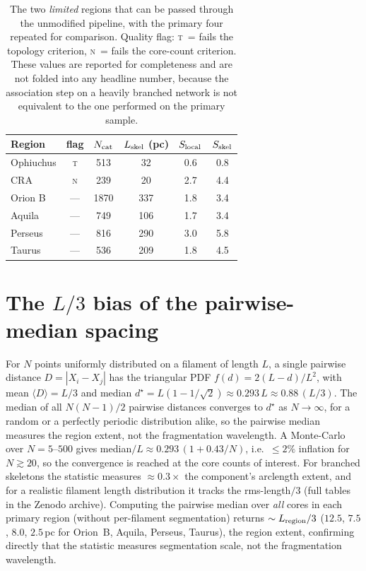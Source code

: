 \documentclass[usenatbib,twoside,twocolumn]{mnras}
\begin{document}
\begin{table}
\caption{The two \emph{limited} regions that can be passed through the unmodified pipeline, with the primary four repeated for comparison. Quality flag: \textsc{t}~= fails the topology criterion, \textsc{n}~= fails the core-count criterion. These values are reported for completeness and are not folded into any headline number, because the association step on a heavily branched network is not equivalent to the one performed on the primary sample.}
\label{tab:limited}
\footnotesize
\setlength{\tabcolsep}{4pt}
\begin{tabular}{lccccc}
\toprule
Region & flag & $N_{\rm cat}$ & $L_{\rm skel}$ (pc) & $S_{\rm local}$ & $S_{\rm skel}$ \\
\midrule
Ophiuchus & \textsc{t} & 513 & 32 & 0.6 & 0.8 \\
CRA       & \textsc{n} & 239 & 20 & 2.7 & 4.4 \\
\midrule
Orion B & --- & 1870 & 337 & 1.8 & 3.4 \\
Aquila  & --- &  749 & 106 & 1.7 & 3.4 \\
Perseus & --- &  816 & 290 & 3.0 & 5.8 \\
Taurus  & --- &  536 & 209 & 1.8 & 4.5 \\
\bottomrule
\end{tabular}
\end{table}




\section{The $L/3$ bias of the pairwise-median spacing}
\label{sec:pwmedian}
For $N$ points uniformly distributed on a filament of length $L$, a single pairwise distance $D=|X_i-X_j|$ has the triangular PDF $f(d)=2(L-d)/L^2$, with mean $\langle D\rangle=L/3$ and median $d^\star=L(1-1/\sqrt{2})\approx0.293\,L\approx0.88\,(L/3)$. The median of all $N(N-1)/2$ pairwise distances converges to $d^\star$ as $N\to\infty$, for a random or a perfectly periodic distribution alike, so the pairwise median measures the region extent, not the fragmentation wavelength. A Monte-Carlo over $N=5$--$500$ gives median$/L\approx0.293\,(1+0.43/N)$, i.e.\ $\le2\%$ inflation for $N\gtrsim20$, so the convergence is reached at the core counts of interest. For branched skeletons the statistic measures $\approx0.3\times$ the component's arclength extent, and for a realistic filament length distribution it tracks the rms-length$/3$ (full tables in the Zenodo archive). Computing the pairwise median over \emph{all} cores in each primary region (without per-filament segmentation) returns $\sim L_{\rm region}/3$ ($12.5$, $7.5$, $8.0$, $2.5$\,pc for Orion~B, Aquila, Perseus, Taurus), the region extent, confirming directly that the statistic measures segmentation scale, not the fragmentation wavelength.
\end{document}
